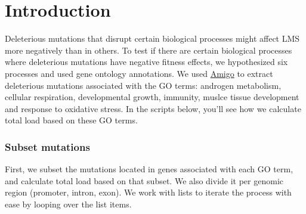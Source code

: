 \documentclass[
  letterpaper,
  DIV=11,
  numbers=noendperiod]{scrreprt}
\begin{document}
\section{Introduction}\label{introduction-6}

Deleterious mutations that disrupt certain biological processes might
affect LMS more negatively than in others. To test if there are certain
biological processes where deleterious mutations have negative fitness
effects, we hypothesized six processes and used gene ontology
annotations. We used
\href{http://amigo.geneontology.org/amigo\%5D}{Amigo} to extract
deleterious mutations associated with the GO terms: androgen metabolism,
cellular respiration, developmental growth, immunity, muslce tissue
development and response to oxidative stress. In the scripts below,
you'll see how we calculate total load based on these GO terms.

\subsubsection{Subset mutations}\label{subset-mutations}

First, we subset the mutations located in genes associated with each GO
term, and calculate total load based on that subset. We also divide it
per genomic region (promoter, intron, exon). We work with lists to
iterate the process with ease by looping over the list items.
\end{document}

